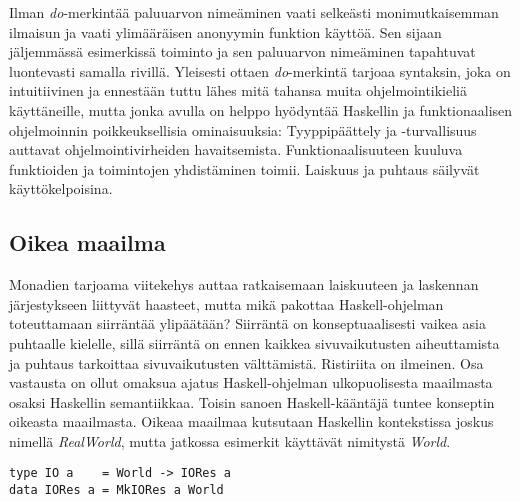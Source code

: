 \documentclass[finnish]{tktltiki2}
\begin{document}

Ilman \emph{do}-merkintää paluuarvon nimeäminen vaati selkeästi monimutkaisemman ilmaisun ja vaati
ylimääräisen anonyymin funktion käyttöä. Sen sijaan jäljemmässä esimerkissä toiminto ja sen
paluuarvon nimeäminen tapahtuvat luontevasti samalla rivillä. Yleisesti ottaen \emph{do}-merkintä
tarjoaa syntaksin, joka on intuitiivinen ja ennestään tuttu lähes mitä tahansa muita
ohjelmointikieliä käyttäneille, mutta jonka avulla on helppo hyödyntää Haskellin ja funktionaalisen
ohjelmoinnin poikkeuksellisia ominaisuuksia: 
Tyyppipäättely ja -turvallisuus auttavat ohjelmointivirheiden havaitsemista. Funktionaalisuuteen
kuuluva funktioiden ja toimintojen yhdistäminen toimii. Laiskuus ja puhtaus säilyvät
käyttökelpoisina.



\subsection{Oikea maailma}

Monadien tarjoama viitekehys auttaa ratkaisemaan laiskuuteen ja laskennan järjestykseen liittyvät
haasteet, mutta mikä pakottaa Haskell-ohjelman toteuttamaan siirräntää ylipäätään? Siirräntä on
konseptuaalisesti vaikea asia puhtaalle kielelle, sillä siirräntä on ennen kaikkea sivuvaikutusten
aiheuttamista ja puhtaus tarkoittaa sivuvaikutusten välttämistä. Ristiriita on ilmeinen. Osa
vastausta on ollut omaksua ajatus Haskell-ohjelman ulkopuolisesta maailmasta osaksi Haskellin
semantiikkaa. Toisin sanoen Haskell-kääntäjä tuntee konseptin oikeasta maailmasta. Oikeaa maailmaa
kutsutaan Haskellin kontekstissa joskus nimellä \emph{RealWorld}, mutta jatkossa esimerkit
 käyttävät nimitystä \emph{World}.

\begin{lstlisting}[float,label={lst:world},caption={IFP, IO-tyyppi}]
type IO a    = World -> IORes a
data IORes a = MkIORes a World
\end{lstlisting}
\end{document}
